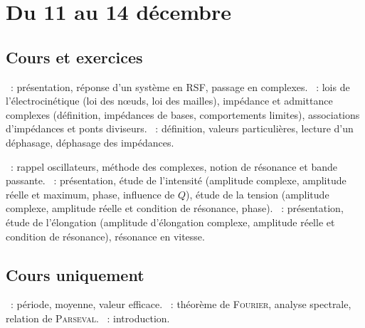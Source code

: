 \documentclass[a4paper, 12pt, final, garamond]{book}
\begin{document}
\setcounter{chapter}{10}

\chapter{Du 11 au 14 d\'ecembre}

\section{Cours et exercices}
\begin{enumerate}[label=\Roman*]
	~: présentation, réponse d'un système
	en RSF, passage en complexes.
	~: lois de l'électrocinétique (loi
	des nœuds, loi des mailles), impédance et admittance complexes
	(définition, impédances de bases, comportements limites), associations
	d'impédances et ponts diviseurs.
	~: définition, valeurs particulières,
	lecture d'un déphasage, déphasage des impédances.
\end{enumerate}

\begin{enumerate}[label=\Roman*]
	~: rappel oscillateurs, méthode des complexes,
	notion de résonance et bande passante.
	~: présentation,
	étude de l'intensité (amplitude complexe, amplitude réelle et maximum,
	phase, influence de $Q$), étude de la tension (amplitude complexe,
	amplitude réelle et condition de résonance, phase).
	~: présentation,
	étude de l'élongation (amplitude d'élongation complexe, amplitude réelle
	et condition de résonance), résonance en vitesse.
\end{enumerate}

\section{Cours uniquement}
\begin{enumerate}[label=\Roman*]
	~: période, moyenne, valeur efficace.
	~: théorème de
	\textsc{Fourier}, analyse spectrale, relation de \textsc{Parseval}.
	~: introduction.
\end{enumerate}

\newpage
\end{document}
